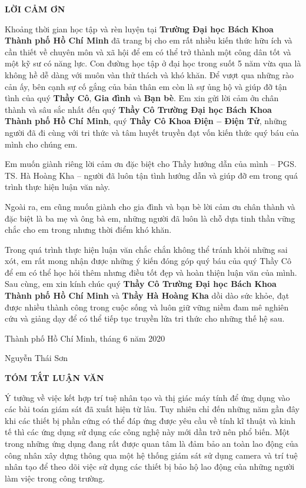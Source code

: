 \documentclass[12pt]{report}
\begin{document}
%
\begin{center}
{\LARGE\bfseries LỜI CẢM ƠN}
\end{center}
Khoảng thời gian học tập và rèn luyện tại \textbf{Trường Đại học Bách Khoa Thành phố Hồ Chí Minh} đã trang bị cho em rất nhiều kiến thức hữu ích và cần thiết về chuyên môn và xã hội để em có thể trở thành một công dân tốt và một kỹ sư
có năng lực. Con đường học tập ở đại học trong suốt 5 năm vừa qua là không hề dễ dàng với muôn vàn thử thách và khó khăn. Để vượt qua những rào cản ấy, bên cạnh sự cố gắng của bản thân em còn là sự ủng hộ và giúp đỡ tận tình của quý \textbf{Thầy Cô}, 
\textbf{Gia đình} và \textbf{Bạn bè}. Em xin gửi lời cảm ởn chân thành và sâu sắc nhất đến quý \textbf{Thầy Cô Trường Đại học Bách Khoa Thành phố Hồ Chí Minh}, quý \textbf{Thầy Cô Khoa Điện – Điện Tử}, những người đã đi cùng với tri thức và tâm huyết truyền đạt vốn kiến thức quý báu của mình cho chúng em.

Em muốn giành riêng lời cảm ơn đặc biệt cho Thầy hướng dẫn của mình – PGS. TS. Hà Hoàng Kha – người đã luôn tận tình hướng dẫn và giúp đỡ em trong quá trình thực hiện luận văn này.

Ngoài ra, em cũng muốn giành cho gia đình và bạn bè lời cảm ơn chân thành và đặc biệt là ba mẹ và ông bà em, những người đã luôn là chỗ dựa tinh thần vững chắc cho em trong nhưng thời điểm khó khăn.

Trong quá trình thực hiện luận văn chắc chắn không thể tránh khỏi những sai xót, em rất mong nhận được những ý kiến đóng góp quý báu của quý Thầy Cô để em có thể học hỏi thêm nhưng điều tốt đẹp và hoàn thiện luận văn của mình. Sau cùng, em xin kính chúc quý \textbf{Thầy Cô Trường Đại học Bách Khoa Thành phố Hồ Chí Minh} và \textbf{Thầy Hà Hoàng Kha} dồi dào sức khỏe, đạt được nhiều thành công trong cuộc sống và luôn giữ vững niềm đam mê nghiên cứu và giảng dạy để có thể tiếp tục truyền lửa tri thức cho những thế hệ sau.

\hfill
Thành phố Hồ Chí Minh, tháng 6 năm 2020

\vspace{0.5cm}

\hfill
Nguyễn Thái Sơn

\newpage
%
\pagestyle{empty}
\begin{center}
{\LARGE\bfseries TÓM TẮT LUẬN VĂN}
\end{center}
Ý tưởng về việc kết hợp trí tuệ nhân tạo và thị giác máy tính để ứng dụng vào các bài 
toán giám sát đã xuất hiện từ lâu. Tuy nhiên chỉ đến những năm gần đây khi các thiết bị
phần cứng có thể đáp ứng được yêu cầu về tính kĩ thuật và kinh tế thì các ứng dụng 
sử dụng các công nghệ này mới dần trở nên phổ biến. Một trong những ứng dụng đang rất được 
quan tâm là đảm bảo an toàn lao động của công nhân xây dựng thông qua một hệ thống giám 
sát sử dụng camera và trí tuệ nhân tạo để theo dõi việc sử dụng các thiết bị bảo hộ lao 
động của những người làm việc trong công trường.
\end{document}
